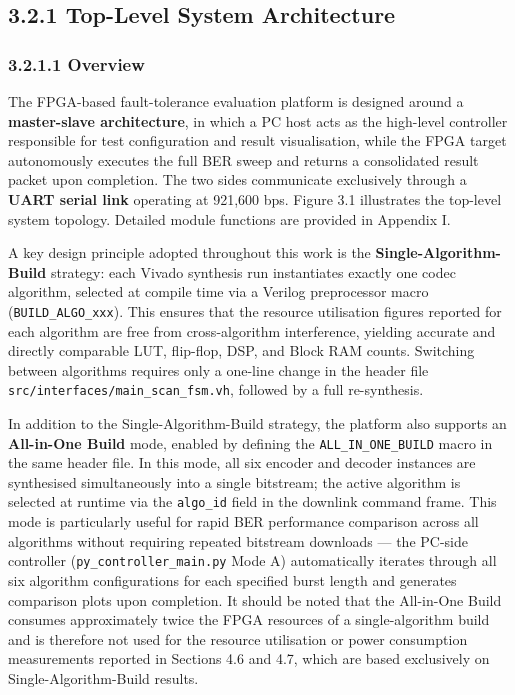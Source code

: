 \documentclass[
  english,
  12pt,
]{report}
\begin{document}
\subsection{3.2.1 Top-Level System
Architecture}\label{top-level-system-architecture}

\subsubsection{3.2.1.1 Overview}\label{overview}

The FPGA-based fault-tolerance evaluation platform is designed around a
\textbf{master-slave architecture}, in which a PC host acts as the
high-level controller responsible for test configuration and result
visualisation, while the FPGA target autonomously executes the full BER
sweep and returns a consolidated result packet upon completion. The two
sides communicate exclusively through a \textbf{UART serial link}
operating at 921,600 bps. Figure 3.1 illustrates the top-level system
topology. Detailed module functions are provided in Appendix I.

A key design principle adopted throughout this work is the
\textbf{Single-Algorithm-Build} strategy: each Vivado synthesis run
instantiates exactly one codec algorithm, selected at compile time via a
Verilog preprocessor macro (\texttt{BUILD\_ALGO\_xxx}). This ensures
that the resource utilisation figures reported for each algorithm are
free from cross-algorithm interference, yielding accurate and directly
comparable LUT, flip-flop, DSP, and Block RAM counts. Switching between
algorithms requires only a one-line change in the header file
\texttt{src/interfaces/main\_scan\_fsm.vh}, followed by a full
re-synthesis.

In addition to the Single-Algorithm-Build strategy, the platform also
supports an \textbf{All-in-One Build} mode, enabled by defining the
\texttt{ALL\_IN\_ONE\_BUILD} macro in the same header file. In this
mode, all six encoder and decoder instances are synthesised
simultaneously into a single bitstream; the active algorithm is selected
at runtime via the \texttt{algo\_id} field in the downlink command
frame. This mode is particularly useful for rapid BER performance
comparison across all algorithms without requiring repeated bitstream
downloads --- the PC-side controller (\texttt{py\_controller\_main.py}
Mode A) automatically iterates through all six algorithm configurations
for each specified burst length and generates comparison plots upon
completion. It should be noted that the All-in-One Build consumes
approximately twice the FPGA resources of a single-algorithm build and
is therefore not used for the resource utilisation or power consumption
measurements reported in Sections 4.6 and 4.7, which are based
exclusively on Single-Algorithm-Build results.
\end{document}
